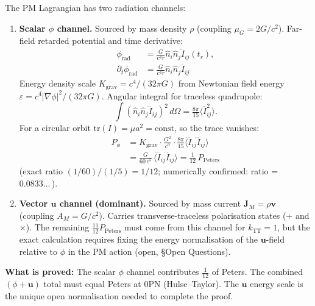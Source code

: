 \documentclass[10pt,twocolumn]{article}
\begin{document}
\noindent The PM Lagrangian has two radiation channels:
\begin{enumerate}
  \item \textbf{Scalar $\phi$ channel.}
        Sourced by mass density $\rho$ (coupling $\mu_G = 2G/c^2$).
        Far-field retarded potential and time derivative:
        \begin{align*}
          \phi_\mathrm{rad} &= \tfrac{G}{c^4 r}\hat{n}_i\hat{n}_j\ddot{I}_{ij}(t_r),\\
          \partial_t\phi_\mathrm{rad} &= \tfrac{G}{c^4 r}\hat{n}_i\hat{n}_j\dddot{I}_{ij}
        \end{align*}
        Energy density scale $K_\mathrm{grav} = c^4/(32\pi G)$ from Newtonian field energy
        $\varepsilon = c^4|\nabla\phi|^2/(32\pi G)$.
        Angular integral for traceless quadrupole:
        \[
          \int(\hat{n}_i\hat{n}_j\dddot{I}_{ij})^2\,d\Omega
          = \tfrac{8\pi}{15}\langle\dddot{I}_{ij}^2\rangle.
        \]
        For a circular orbit $\mathrm{tr}(I) = \mu a^2 = \mathrm{const}$, so the trace vanishes:
        \begin{align*}
          P_\phi &= K_\mathrm{grav} \cdot \frac{G^2}{c^9} \cdot \frac{8\pi}{15}
                  \bigl\langle\dddot{I}_{ij}\dddot{I}_{ij}\bigr\rangle \\
                 &= \frac{G}{60\,c^5}\,\bigl\langle\dddot{I}_{ij}\dddot{I}_{ij}\bigr\rangle
                  = \frac{1}{12}\,P_\mathrm{Peters}
        \end{align*}
        (exact ratio $(1/60)/(1/5) = 1/12$; numerically confirmed: ratio = $0.0833...\,$).

  \item \textbf{Vector $\mathbf{u}$ channel (dominant).}
        Sourced by mass current $\mathbf{J}_M = \rho\mathbf{v}$ (coupling $A_M = G/c^2$).
        Carries transverse-traceless polarisation states ($+$ and $\times$).
        The remaining $\tfrac{11}{12}P_\mathrm{Peters}$ must come from this channel for $k_\mathrm{TT}=1$,
        but the exact calculation requires fixing the energy normalisation of the $\mathbf{u}$-field
        relative to $\phi$ in the PM action (open, \S Open Questions).
\end{enumerate}
\noindent\textbf{What is proved:} The scalar $\phi$ channel contributes $\tfrac{1}{12}$ of Peters.
The combined $(\phi + \mathbf{u})$ total must equal Peters at 0PN (Hulse--Taylor).
The $\mathbf{u}$ energy scale is the unique open normalisation needed to complete the proof.
\end{document}
